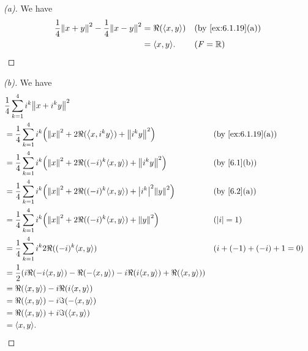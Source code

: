 \begin{proof}[(a)]
	We have
	\begin{align*}
		\frac{1}{4} \norm{x + y}^2 - \frac{1}{4} \norm{x - y}^2 & = \Re(\inn{x, y}) &  & \by{ex:6.1.19}[a] \\
		                                                        & = \inn{x, y}.     &  & (\F = \R)
	\end{align*}
\end{proof}

\begin{proof}[(b)]
	We have
	\begin{align*}
		 & \frac{1}{4} \sum_{k = 1}^4 i^k \norm{x + i^k y}^2                                                                                   \\
		 & = \frac{1}{4} \sum_{k = 1}^4 i^k \pa{\norm{x}^2 + 2 \Re(\inn{x, i^k y}) + \norm{i^k y}^2}            &  & \by{ex:6.1.19}[a]         \\
		 & = \frac{1}{4} \sum_{k = 1}^4 i^k \pa{\norm{x}^2 + 2 \Re((-i)^k \inn{x, y}) + \norm{i^k y}^2}         &  & \by{6.1}[b]               \\
		 & = \frac{1}{4} \sum_{k = 1}^4 i^k \pa{\norm{x}^2 + 2 \Re((-i)^k \inn{x, y}) + \abs{i^k}^2 \norm{y}^2} &  & \by{6.2}[a]               \\
		 & = \frac{1}{4} \sum_{k = 1}^4 i^k \pa{\norm{x}^2 + 2 \Re((-i)^k \inn{x, y}) + \norm{y}^2}             &  & (\abs{i} = 1)             \\
		 & = \frac{1}{4} \sum_{k = 1}^4 i^k 2 \Re((-i)^k \inn{x, y})                                            &  & (i + (-1) + (-i) + 1 = 0) \\
		 & = \frac{1}{2} \pa{i \Re(-i \inn{x, y}) - \Re(-\inn{x, y}) - i \Re(i \inn{x, y}) + \Re(\inn{x, y})}                                  \\
		 & = \Re(\inn{x, y}) - i \Re(i \inn{x, y})                                                                                             \\
		 & = \Re(\inn{x, y}) - i \Im(-\inn{x, y})                                                                                              \\
		 & = \Re(\inn{x, y}) + i \Im(\inn{x, y})                                                                                               \\
		 & = \inn{x, y}.
	\end{align*}
\end{proof}

